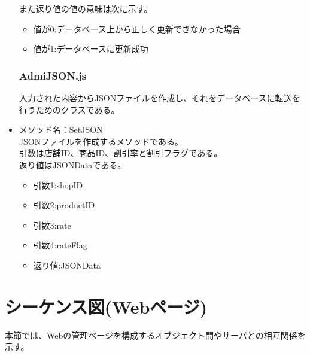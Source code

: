 \documentclass[a4j]{jarticle}
\begin{document}
\begin{itemize}
\begin{itemize}
	\end{itemize}
また返り値の値の意味は次に示す。
	\begin{itemize}
		\item 値が0:データベース上から正しく更新できなかった場合
		\item 値が1:データベースに更新成功
	\end{itemize}

\subsubsection{AdmiJSON.js}

入力された内容からJSONファイルを作成し、それをデータベースに転送を行うためのクラスである。\\

\item メソッド名：SetJSON\\

JSONファイルを作成するメソッドである。\\
引数は店舗ID、商品ID、割引率と割引フラグである。\\
返り値はJSONDataである。
	\begin{itemize}
		\item 引数1:shopID
		\item 引数2:productID
		\item 引数3:rate
		\item 引数4:rateFlag
	\end{itemize}
	\begin{itemize}
		\item 返り値:JSONData
	\end{itemize}
\end{itemize}
\section{シーケンス図(Webページ)}
本節では、Webの管理ページを構成するオブジェクト間やサーバとの相互関係を示す。
\end{document}
